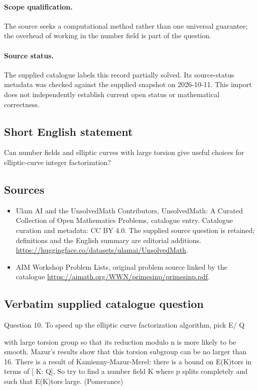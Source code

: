 \documentclass[11pt]{article}
\begin{document}
\paragraph{Scope qualification.}
The source seeks a computational method rather than one universal guarantee; the overhead of working in the number field is part of the question.
\paragraph{Source status.}
The supplied catalogue labels this record partially solved. Its source-status metadata was checked against the supplied snapshot on 2026-10-11. This import does not independently establish current open status or mathematical correctness.
\subsection{Short English statement}
Can number fields and elliptic curves with large torsion give useful choices for elliptic-curve integer factorization?
\subsection{Sources}
\begin{itemize}
\item[S1] Ulam AI and the UnsolvedMath Contributors, UnsolvedMath: A Curated Collection of Open Mathematics Problems, catalogue entry. Catalogue curation and metadata: CC BY 4.0. The supplied source question is retained; definitions and the English summary are editorial additions.
\url{https://huggingface.co/datasets/ulamai/UnsolvedMath}.
\item[S2] AIM Workshop Problem Lists, original problem source linked by the catalogue
\url{https://aimath.org/WWN/primesinp/primesinp.pdf}.
\end{itemize}
\subsection{Verbatim supplied catalogue question}
Question 10. To speed up the elliptic curve factorization algorithm, pick E/ Q

with large torsion group so that its reduction modulo n is more likely to be smooth. Mazur's results show that this torsion subgroup can be no larger than 16. There is a result of Kamienny-Mazur-Merel: there is a bound on E(K)tors in terms of [ K: Q]. So try to find a number field K where p splits completely and such that E(K)tors large. (Pomerance)
\end{document}
